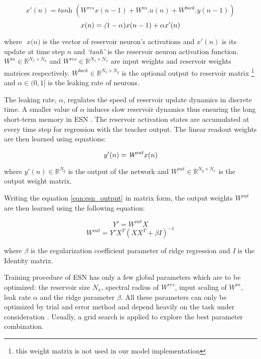 \begin{equation} \label{eqn:res_update}
x'(n) =\textit {tanh } ( W^{res}x(n-1) + W^{in}.u(n) + W^{back}.y(n-1))
\end{equation}
\begin{equation} \label{eqn:res_state}
x(n) =\textit (1-\alpha) x(n-1) + \alpha x'(n)
\end{equation}

where $\textit{ x(n)}$ is the vector of reservoir neuron's activations and \textit{ $x'(n)$} is its update at time step $\textit{n}$ and \textit{`tanh'} is the reservoir neuron activation function. $ W^{in} \in \mathbb{R}^{{N_x} \times{N_u}}$ and $ W^{res} \in \mathbb{R}^{{N_x} \times{N_x}} $ are input weights and reservoir weights matrices respectively. $ W^{back} \in \mathbb{R}^{{N_x} \times{N_y}} $ is the optional output to reservoir matrix \footnote{this weight matrix is not used in our model implementation} and $\alpha \in (0,1]$ is the leaking rate of neurons.  

The leaking rate, $\alpha$, regulates the speed of reservoir update dynamics in discrete time. A smaller value of $\alpha$  induces slow reservoir dynamics thus ensuring the long short-term memory in ESN \cite{esn:practical_guide, esn:optimization_leaky_neurons}. The reservoir activation states are accumulated at every time step for regression with the teacher output. The linear readout weights are then learned using equations:

\begin{equation}\label{eqn:esn_output}
y'(n) = \textit W^{out}x(n)
\end{equation}

where $y'(n) \in \mathbb{R}^{N_y}$ is the output of the network and $W^{out} \in \mathbb{R}^{{N_y} \times {N_x}}$ is the output weight matrix.

Writing the equation \ref{eqn:esn_output} in matrix form, the output weights $W^{out}$ are then learned using the following equation:
 
\begin{equation}
Y'=W^{out}X
\end{equation}
\begin{equation}
W^{out}=Y'X^{T}(XX^{T}+{\beta}I)^{-1}
\end{equation}

where $\beta$ is the regularization coefficient parameter of ridge regression and \textit{I} is the Identity matrix. 

Training procedure of ESN has only a few global parameters which are to be optimized: the reservoir size $ N_{x} $, spectral radius of $W^{res}$, input scaling of $W^{in}$, leak rate $\alpha$ and the ridge parameter $\beta$. All these parameters can only be optimized by trial and error method and depend heavily on the task under consideration \cite{esn:practical_guide}. Usually, a grid search is applied to explore the best parameter combination.     
